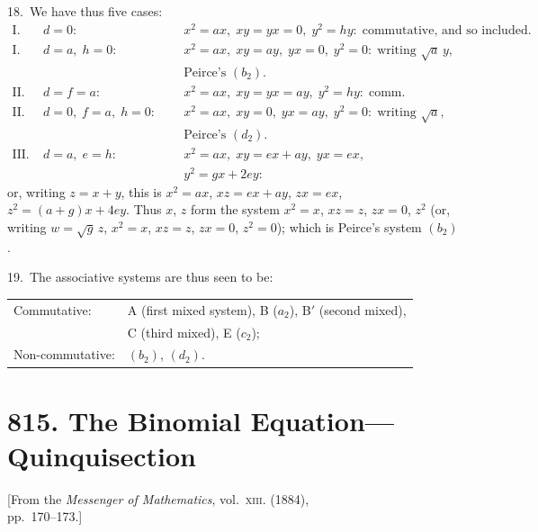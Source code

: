 \documentclass[11pt,a4paper]{book}
\begin{document}
18.~We have thus five cases:
\begin{align*}
\text{I.(a)}\;& d=0:\;\; && x^2=ax,\; xy=yx=0,\; y^2=hy:\;\text{commutative, and so included.}\\
\text{I.(b)}\;& d=a,\; h=0:\;\; && x^2=ax,\; xy=ay,\; yx=0,\; y^2=0:\;\text{writing }\sqrt{a}\,y,\\
&&&\text{Peirce's $(b_2)$.}\\
\text{II.(c)}\;& d=f=a:\;\; && x^2=ax,\; xy=yx=ay,\; y^2=hy:\;\text{comm.}\\
\text{II.(d)}\;& d=0,\; f=a,\; h=0:\;\; && x^2=ax,\; xy=0,\; yx=ay,\; y^2=0:\;\text{writing }\sqrt{a},\\
&&&\text{Peirce's $(d_2)$.}\\
\text{III.(e)}\;& d=a,\; e=h:\;\; && x^2=ax,\; xy=ex+ay,\; yx=ex,\\
&&& y^2=gx+2ey:
\end{align*}
or, writing $z=x+y$, this is $x^2=ax$, $xz=ex+ay$, $zx=ex$, $z^2=(a+g)x+4ey$. Thus $x$, $z$ form the system $x^2=x$, $xz=z$, $zx=0$, $z^2$ (or, writing $w=\sqrt{g}\,z$, $x^2=x$, $xz=z$, $zx=0$, $z^2=0$); which is Peirce's system $(b_2)$.

19.~The associative systems are thus seen to be:
\begin{center}
\begin{tabular}{ll}
Commutative: & A (first mixed system), B ($a_2$), B$'$ (second mixed), \\
& C (third mixed), E ($c_2$);\\[0.3em]
Non-commutative: & $(b_2)$, $(d_2)$.
\end{tabular}
\end{center}

\medskip



\newpage
\section*{815. The Binomial Equation---Quinquisection}

\begin{center}
\small[From the \textit{Messenger of Mathematics}, vol.~\textsc{xiii}. (1884),\\
pp.~170--173.]
\end{center}
\end{document}
